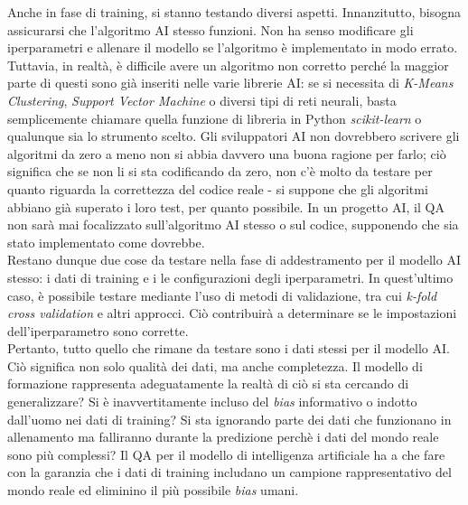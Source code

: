 \documentclass[a4paper,12pt]{report}
\begin{document}
Anche in fase di training, si stanno testando diversi aspetti. Innanzitutto, bisogna assicurarsi che l'algoritmo AI stesso funzioni. Non ha senso modificare gli iperparametri e allenare il modello se l'algoritmo è implementato in modo errato. Tuttavia, in realtà, è difficile avere un algoritmo non corretto perché la maggior parte di questi sono già inseriti nelle varie librerie AI: se si necessita di \textit{K-Means Clustering}, \textit{Support Vector Machine} o diversi tipi di reti neurali, basta semplicemente chiamare quella funzione di libreria in Python \textit{scikit-learn} o qualunque sia lo strumento scelto. Gli sviluppatori AI non dovrebbero scrivere gli algoritmi da zero a meno non si abbia davvero una buona ragione per farlo; ciò significa che se non li si sta codificando da zero, non c'è molto da testare per quanto riguarda la correttezza del codice reale - si suppone che gli algoritmi abbiano già superato i loro test, per quanto possibile. In un progetto AI, il QA non sarà mai focalizzato sull'algoritmo AI stesso o sul codice, supponendo che sia stato implementato come dovrebbe.\\
Restano dunque due cose da testare nella fase di addestramento per il modello AI stesso: i dati di training e i le configurazioni degli iperparametri. In quest'ultimo caso, è possibile testare mediante l'uso di metodi di validazione, tra cui \textit{k-fold cross validation} e altri approcci. Ciò contribuirà a determinare se le impostazioni dell'iperparametro sono corrette.\\
Pertanto, tutto quello che rimane da testare sono i dati stessi per il modello AI. Ciò significa non solo qualità dei dati, ma anche completezza. Il modello di formazione rappresenta adeguatamente la realtà di ciò si sta cercando di generalizzare? Si è inavvertitamente incluso del \textit{bias} informativo o indotto dall'uomo nei dati di training? Si sta ignorando parte dei dati che funzionano in allenamento ma falliranno durante la predizione perchè i dati del mondo reale sono più complessi? Il QA per il modello di intelligenza artificiale ha a che fare con la garanzia che i dati di training includano un campione rappresentativo del mondo reale ed eliminino il più possibile \textit{bias} umani.\\~\\
\end{document}
